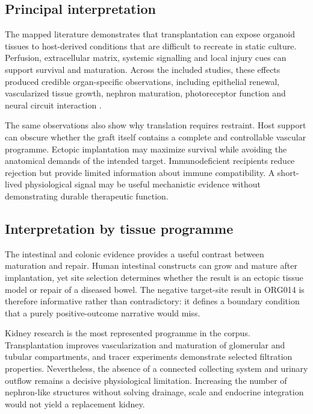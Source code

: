 \documentclass[11pt,a4paper]{article}
\begin{document}
\subsection{Principal interpretation}

The mapped literature demonstrates that transplantation can expose organoid tissues to host-derived conditions that are difficult to recreate in static culture. Perfusion, extracellular matrix, systemic signalling and local injury cues can support survival and maturation. Across the included studies, these effects produced credible organ-specific observations, including epithelial renewal, vascularized tissue growth, nephron maturation, photoreceptor function and neural circuit interaction \citep{yui2012,takebe2013,watson2014,vandenberg2018,mclelland2018,revah2022}.

The same observations also show why translation requires restraint. Host support can obscure whether the graft itself contains a complete and controllable vascular programme. Ectopic implantation may maximize survival while avoiding the anatomical demands of the intended target. Immunodeficient recipients reduce rejection but provide limited information about immune compatibility. A short-lived physiological signal may be useful mechanistic evidence without demonstrating durable therapeutic function.

\subsection{Interpretation by tissue programme}

The intestinal and colonic evidence provides a useful contrast between maturation and repair. Human intestinal constructs can grow and mature after implantation, yet site selection determines whether the result is an ectopic tissue model or repair of a diseased bowel. The negative target-site result in ORG014 is therefore informative rather than contradictory: it defines a boundary condition that a purely positive-outcome narrative would miss.

Kidney research is the most represented programme in the corpus. Transplantation improves vascularization and maturation of glomerular and tubular compartments, and tracer experiments demonstrate selected filtration properties. Nevertheless, the absence of a connected collecting system and urinary outflow remains a decisive physiological limitation. Increasing the number of nephron-like structures without solving drainage, scale and endocrine integration would not yield a replacement kidney.
\end{document}
